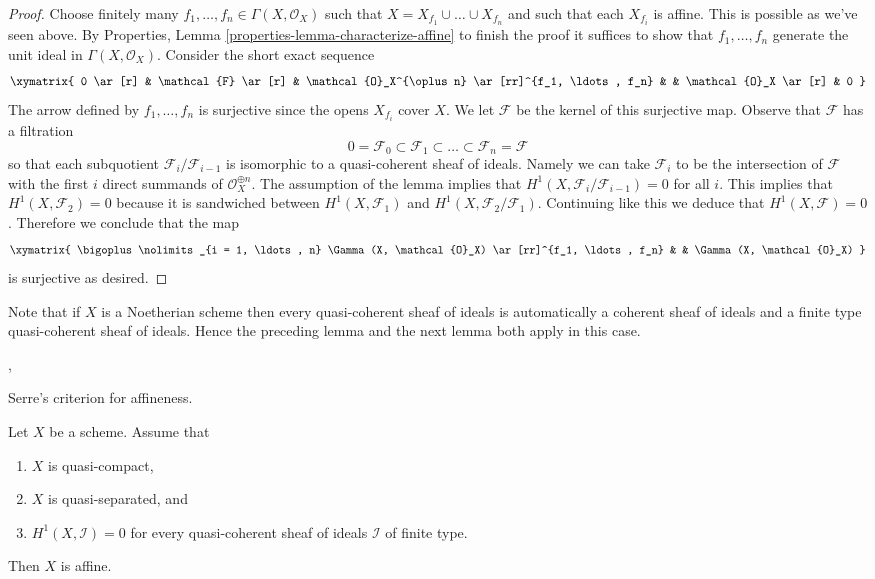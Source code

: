 \begin{proof}
\medskip\noindent
Choose finitely many $f_1, \ldots, f_n \in \Gamma(X, \mathcal{O}_X)$
such that $X = X_{f_1} \cup \ldots \cup X_{f_n}$ and such that each
$X_{f_i}$ is affine. This is possible as we've seen above.
By Properties, Lemma \ref{properties-lemma-characterize-affine}
to finish the proof it suffices
to show that $f_1, \ldots, f_n$ generate the unit ideal in
$\Gamma(X, \mathcal{O}_X)$. Consider the short exact sequence
$$
\xymatrix{
0 \ar[r] &
\mathcal{F} \ar[r] &
\mathcal{O}_X^{\oplus n} \ar[rr]^{f_1, \ldots, f_n} & &
\mathcal{O}_X \ar[r] &
0
}
$$
The arrow defined by $f_1, \ldots, f_n$ is surjective since the
opens $X_{f_i}$ cover $X$. We let $\mathcal{F}$ be the kernel
of this surjective map.
Observe that $\mathcal{F}$ has a filtration
$$
0 = \mathcal{F}_0 \subset \mathcal{F}_1 \subset
\ldots \subset \mathcal{F}_n = \mathcal{F}
$$
so that each subquotient $\mathcal{F}_i/\mathcal{F}_{i - 1}$ is
isomorphic to a quasi-coherent sheaf of ideals.
Namely we can take $\mathcal{F}_i$ to be the intersection of
$\mathcal{F}$ with the first $i$ direct summands of
$\mathcal{O}_X^{\oplus n}$.
The assumption
of the lemma implies that $H^1(X, \mathcal{F}_i/\mathcal{F}_{i - 1}) = 0$
for all $i$. This implies that
$H^1(X, \mathcal{F}_2) = 0$ because it is sandwiched between
$H^1(X, \mathcal{F}_1)$ and $H^1(X, \mathcal{F}_2/\mathcal{F}_1)$.
Continuing like this we deduce that $H^1(X, \mathcal{F}) = 0$.
Therefore we conclude that the map
$$
\xymatrix{
\bigoplus\nolimits_{i = 1, \ldots, n} \Gamma(X, \mathcal{O}_X)
\ar[rr]^{f_1, \ldots, f_n} & &
\Gamma(X, \mathcal{O}_X)
}
$$
is surjective as desired.
\end{proof}

\noindent
Note that if $X$ is a Noetherian scheme then every quasi-coherent
sheaf of ideals is automatically a coherent sheaf of ideals and a
finite type quasi-coherent sheaf of ideals. Hence
the preceding lemma and the next lemma both apply in this case.

\begin{lemma}
\label{lemma-quasi-separated-h1-zero-covering}
\begin{reference}
\cite{Serre-criterion}, \cite[II, Theorem 5.2.1]{EGA}
\end{reference}
\begin{slogan}
Serre's criterion for affineness.
\end{slogan}
Let $X$ be a scheme. Assume that
\begin{enumerate}
\item $X$ is quasi-compact,
\item $X$ is quasi-separated, and
\item $H^1(X, \mathcal{I}) = 0$ for every quasi-coherent sheaf
of ideals $\mathcal{I}$ of finite type.
\end{enumerate}
Then $X$ is affine.
\end{lemma}

